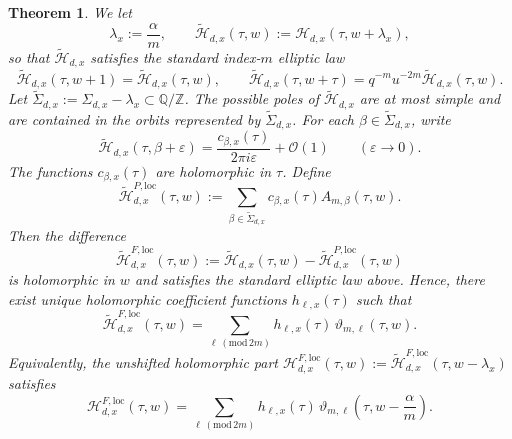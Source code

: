 \documentclass[12pt]{amsart}
\numberwithin{equation}{section}
\newtheorem{theorem}{Theorem}[section]
\newcommand{\QQ}{\mathbb Q}
\newcommand{\ZZ}{\mathbb Z}
\newcommand{\OO}{\mathcal O}
\begin{document}
\begin{theorem}\label{thm:general-root:ivplusv}
 We let
\[
\lambda_x:=\frac{\alpha}{m},
\qquad
\widetilde{\mathcal H}_{d,x}(\tau,w):=\mathcal H_{d,x}(\tau,w+\lambda_x),
\]
so that $\widetilde{\mathcal H}_{d,x}$ satisfies the standard index-$m$ elliptic law
\[
\widetilde{\mathcal H}_{d,x}(\tau,w+1)=\widetilde{\mathcal H}_{d,x}(\tau,w),
\qquad
\widetilde{\mathcal H}_{d,x}(\tau,w+\tau)=q^{-m}u^{-2m}\widetilde{\mathcal H}_{d,x}(\tau,w).
\]
Let $\widetilde\Sigma_{d,x}:=\Sigma_{d,x}-\lambda_x\subset \QQ/\ZZ$.  The possible poles of $\widetilde{\mathcal H}_{d,x}$ are at most simple and are contained in the orbits represented by $\widetilde\Sigma_{d,x}$.  For each $\beta\in\widetilde\Sigma_{d,x}$, write
\[
\widetilde{\mathcal H}_{d,x}(\tau,\beta+\varepsilon)
=
\frac{c_{\beta,x}(\tau)}{2\pi i\varepsilon}+\OO(1)
\qquad (\varepsilon\to 0).
\]
The functions \(c_{\beta,x}(\tau)\) are holomorphic in \(\tau\).  
Define
\begin{equation}\label{eq:H-polar-general}
\widetilde{\mathcal H}_{d,x}^{P,\mathrm{loc}}(\tau,w)
:=
\sum_{\beta\in\widetilde\Sigma_{d,x}}c_{\beta,x}(\tau)A_{m,\beta}(\tau,w).
\end{equation}
Then the difference
\begin{equation}\label{eq:H-finite-general}
\widetilde{\mathcal H}_{d,x}^{F,\mathrm{loc}}(\tau,w)
:=
\widetilde{\mathcal H}_{d,x}(\tau,w)-\widetilde{\mathcal H}_{d,x}^{P,\mathrm{loc}}(\tau,w)
\end{equation}
is holomorphic in $w$ and satisfies the standard elliptic law above. Hence, there exist unique holomorphic coefficient functions $h_{\ell,x}(\tau)$ such that
\begin{equation}\label{eq:H-theta-general}
\widetilde{\mathcal H}_{d,x}^{F,\mathrm{loc}}(\tau,w)
=
\sum_{\ell\, (\mathrm{mod}\,2m)} h_{\ell,x}(\tau)\,\vartheta_{m,\ell}(\tau,w).
\end{equation}
Equivalently, the unshifted holomorphic part $\mathcal H_{d,x}^{F,\mathrm{loc}}(\tau,w):=\widetilde{\mathcal H}_{d,x}^{F,\mathrm{loc}}(\tau,w-\lambda_x)$ satisfies
\[
\mathcal H_{d,x}^{F,\mathrm{loc}}(\tau,w)
=
\sum_{\ell\, (\mathrm{mod}\,2m)} h_{\ell,x}(\tau)\,\vartheta_{m,\ell}\!\left(\tau,w-\frac{\alpha}{m}\right).
\]
\end{theorem}
    
\end{document}
